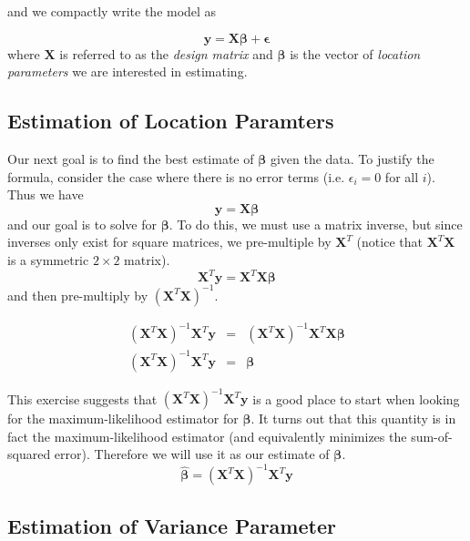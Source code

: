 \documentclass[]{book}
\theoremstyle{definition}
\theoremstyle{definition}
\theoremstyle{remark}
\begin{document}
and we compactly write the model as

\[
\boldsymbol{y}=\boldsymbol{X}\boldsymbol{\beta}+\boldsymbol{\epsilon}
\] where \(\boldsymbol{X}\) is referred to as the \emph{design matrix}
and \(\boldsymbol{\beta}\) is the vector of \emph{location parameters}
we are interested in estimating.

\subsection{Estimation of Location
Paramters}\label{estimation-of-location-paramters}

Our next goal is to find the best estimate of \(\boldsymbol{\beta}\)
given the data. To justify the formula, consider the case where there is
no error terms (i.e. \(\epsilon_{i}=0\) for all \(i\)). Thus we have \[
\boldsymbol{y}=\boldsymbol{X}\boldsymbol{\beta}
\] and our goal is to solve for \(\boldsymbol{\beta}\). To do this, we
must use a matrix inverse, but since inverses only exist for square
matrices, we pre-multiple by \(\boldsymbol{X}^{T}\) (notice that
\(\boldsymbol{X}^{T}\boldsymbol{X}\) is a symmetric \(2\times2\)
matrix). \[
\boldsymbol{X}^{T}\boldsymbol{y}=\boldsymbol{X}^{T}\boldsymbol{X}\boldsymbol{\beta}
\] and then pre-multiply by
\(\left(\boldsymbol{X}^{T}\boldsymbol{X}\right)^{-1}\).

\[\begin{eqnarray*}
\left(\boldsymbol{X}^{T}\boldsymbol{X}\right)^{-1}\boldsymbol{X}^{T}\boldsymbol{y} & = & \left(\boldsymbol{X}^{T}\boldsymbol{X}\right)^{-1}\boldsymbol{X}^{T}\boldsymbol{X}\boldsymbol{\beta}\\
\left(\boldsymbol{X}^{T}\boldsymbol{X}\right)^{-1}\boldsymbol{X}^{T}\boldsymbol{y} & = & \boldsymbol{\beta}
\end{eqnarray*}\]

This exercise suggests that
\(\left(\boldsymbol{X}^{T}\boldsymbol{X}\right)^{-1}\boldsymbol{X}^{T}\boldsymbol{y}\)
is a good place to start when looking for the maximum-likelihood
estimator for \(\boldsymbol{\beta}\). It turns out that this quantity is
in fact the maximum-likelihood estimator (and equivalently minimizes the
sum-of-squared error). Therefore we will use it as our estimate of
\(\boldsymbol{\beta}\). \[
\hat{\boldsymbol{\beta}}=\left(\boldsymbol{X}^{T}\boldsymbol{X}\right)^{-1}\boldsymbol{X}^{T}\boldsymbol{y}
\]

\subsection{Estimation of Variance
Parameter}\label{estimation-of-variance-parameter}
\end{document}
